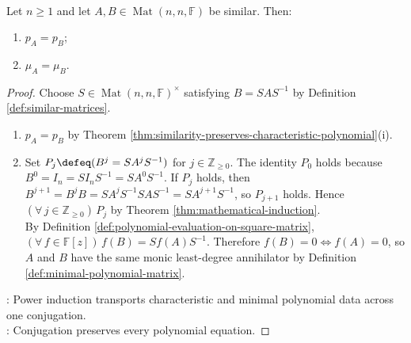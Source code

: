 \begin{theorem} \label{thm:similarity-preserves-minimal-polynomial} \\
Let $n\geq1$ and let $A,B\in\operatorname{Mat}(n,n,\mathbb{F})$ be similar. Then:
\begin{enumerate}[label=(\roman*)]
\setlength{\itemsep}{0pt}
\item $p_A=p_B$;
\item $\mu_A=\mu_B$.
\end{enumerate}
\begin{proof}
Choose $S\in\operatorname{Mat}(n,n,\mathbb{F})^{\times}$ satisfying $B=SAS^{-1}$ by Definition \ref{def:similar-matrices}.
\begin{enumerate}[label=(\roman*)]
\setlength{\itemsep}{0pt}
\item $p_A=p_B$ by Theorem \ref{thm:similarity-preserves-characteristic-polynomial}(i).
\item Set $P_j\defeq(B^j=SA^jS^{-1})$ for $j\in\mathbb{Z}_{\geq0}$. The identity $P_0$ holds because $B^0=I_n=SI_nS^{-1}=SA^0S^{-1}$. If $P_j$ holds, then $B^{j+1}=B^jB=SA^jS^{-1}SAS^{-1}=SA^{j+1}S^{-1}$, so $P_{j+1}$ holds. Hence $(\forall\,j\in\mathbb{Z}_{\geq0})\,P_j$ by Theorem \ref{thm:mathematical-induction}.\\
By Definition \ref{def:polynomial-evaluation-on-square-matrix}, $(\forall\,f\in\mathbb{F}[z])\,f(B)=Sf(A)S^{-1}$. Therefore $f(B)=0\Longleftrightarrow f(A)=0$, so $A$ and $B$ have the same monic least-degree annihilator by Definition \ref{def:minimal-polynomial-matrix}.
\end{enumerate}
: Power induction transports characteristic and minimal polynomial data across one conjugation.\\
: Conjugation preserves every polynomial equation.
\end{proof}
\end{theorem}
